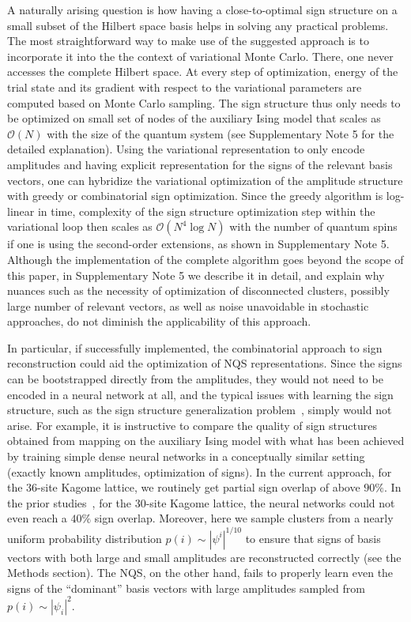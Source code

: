 A naturally arising question is how having a close-to-optimal sign structure on a small subset of the Hilbert space basis helps in solving any practical problems. The most straightforward way to make use of the suggested approach is to incorporate it into the the context of variational Monte Carlo. There, one never accesses the complete Hilbert space. At every step of optimization, energy of the trial state and its gradient with respect to the variational parameters are computed based on Monte Carlo sampling. The sign structure thus only needs to be optimized on small set of nodes of the auxiliary Ising model that scales as $\mathcal{O}(N)$ with the size of the quantum system (see Supplementary Note 5 for the detailed explanation). Using the variational representation to only encode amplitudes and having explicit representation for the signs of the relevant basis vectors, one can hybridize the variational optimization of the amplitude structure with greedy or combinatorial sign optimization. Since the greedy algorithm is log-linear in time, complexity of the sign structure optimization step within the variational loop then scales as $\mathcal{O}(N^4\log N)$ with the number of quantum spins if one is using the second-order extensions, as shown in Supplementary Note 5. Although the implementation of the complete algorithm goes beyond the scope of this paper, in Supplementary Note 5 we describe it in detail, and explain why nuances such as the necessity of optimization of disconnected clusters, possibly large number of relevant vectors, as well as noise unavoidable in stochastic approaches, do not diminish the applicability of this approach.

In particular, if successfully implemented, the combinatorial approach to sign reconstruction could aid the optimization of NQS representations.  Since the signs can be bootstrapped directly from the amplitudes, they would not need to be encoded in a neural network at all, and the typical issues with learning the sign structure, such as the sign structure generalization problem~\cite{sign_generalization}, simply would not arise. For example, it is instructive to compare the quality of sign structures obtained from mapping on the auxiliary Ising model with what has been achieved by training simple dense neural networks in a conceptually similar setting~\cite{sign_generalization} (exactly known amplitudes, optimization of signs). In the current approach, for the 36-site Kagome lattice, we routinely get partial sign overlap of above $90\%$. In the prior studies~\cite{sign_generalization}, for the 30-site Kagome lattice, the neural networks could not even reach a $40\%$ sign overlap. Moreover, here we sample clusters from a nearly uniform probability distribution $p(i) \sim |\psi^i|^{1/10}$ to ensure that signs of basis vectors with both large and small amplitudes are reconstructed correctly (see the Methods section). The NQS, on the other hand, fails to properly learn even the signs of the ``dominant'' basis vectors with large amplitudes sampled from $p(i) \sim |\psi_i|^2$.

